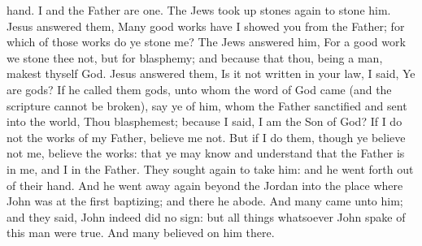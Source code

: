 hand. I and the Father are one. The Jews took up stones again to stone him. Jesus answered them, Many good works have I showed you from the Father; for which of those works do ye stone me? The Jews answered him, For a good work we stone thee not, but for blasphemy; and because that thou, being a man, makest thyself God. Jesus answered them, Is it not written in your law, I said, Ye are gods? If he called them gods, unto whom the word of God came (and the scripture cannot be broken), say ye of him, whom the Father sanctified and sent into the world, Thou blasphemest; because I said, I am the Son of God? If I do not the works of my Father, believe me not. But if I do them, though ye believe not me, believe the works: that ye may know and understand that the Father is in me, and I in the Father. They sought again to take him: and he went forth out of their hand.  And he went away again beyond the Jordan into the place where John was at the first baptizing; and there he abode. And many came unto him; and they said, John indeed did no sign: but all things whatsoever John spake of this man were true. And many believed on him there. 

